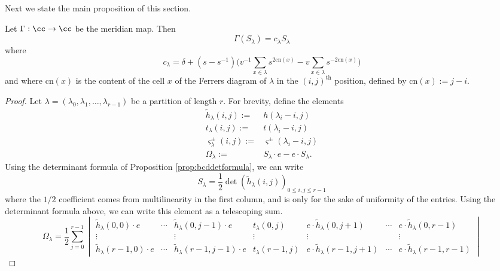 Next we state the main proposition of this section.
\begin{proposition} \label{prop:schureigenvalues}
Let $\Gamma: \cc \to \cc$ be the meridian map. Then
\begin{equation}
\Gamma ( S_\lambda ) = c_\lambda S_\lambda
\end{equation}
where
\begin{equation}
c_\lambda = \delta + ( s - s^{-1} ) \Big( v^{-1} \sum_{x \in \lambda} s^{2 \textrm{cn}(x)} - v \sum_{x \in \lambda} s^{-2 \textrm{cn}(x)} \Big)
\end{equation}
and where $\textrm{cn}(x)$ is the content of the cell $x$ of the Ferrers diagram of $\lambda$ in the $(i,j)^{\textrm{th}}$ position, defined by $\textrm{cn}(x) := j-i$.
\end{proposition}
\begin{proof}
Let $\lambda=(\lambda_0, \lambda_1, \dots, \lambda_{r-1})$ be a partition of length $r$. For brevity, define the elements
\begin{eqnarray*}
\tilde{h}_\lambda (i, j) :=&  h(\lambda_i - i, j) \\
t_\lambda (i, j) :=& t(\lambda_i - i, j) \\
\varsigma_\lambda^\pm (i, j) :=& \varsigma^\pm (\lambda_i - i, j) \\
\Omega_\lambda :=& S_\lambda \cdot e - e \cdot S_\lambda .
\end{eqnarray*}
Using the determinant formula of Proposition \ref{prop:bcddetformula}, we can write
\begin{equation}\label{eq:bcddetformula}
S_\lambda = \frac{1}{2} \det \left( \tilde{h}_\lambda(i, j) \right)_{0 \leq i, j \leq r-1}
\end{equation}
where the $1/2$ coefficient comes from multilinearity in the first column, and is only for the sake of uniformity of the entries. 
Using the determinant formula above, we can write this element as a telescoping sum.
\begin{equation}
\Omega_\lambda = \frac{1}{2} \sum_{j=0}^{r-1}
\begin{vmatrix}
\tilde{h}_\lambda (0, 0) \cdot e & \cdots & \tilde{h}_\lambda (0, j-1) \cdot e & t_\lambda (0, j) & e \cdot \tilde{h}_\lambda (0, j+1) & \cdots & e \cdot \tilde{h}_\lambda (0, r-1) \\ 
\vdots & & \vdots & \vdots & \vdots & & \vdots \\
\tilde{h}_\lambda (r-1, 0) \cdot e & \cdots & \tilde{h}_\lambda (r-1, j-1) \cdot e & t_\lambda (r-1, j) & e \cdot \tilde{h}_\lambda (r-1, j+1) & \cdots & e \cdot \tilde{h}_\lambda (r-1, r-1)
\end{vmatrix}
\end{equation}


\end{proof}
